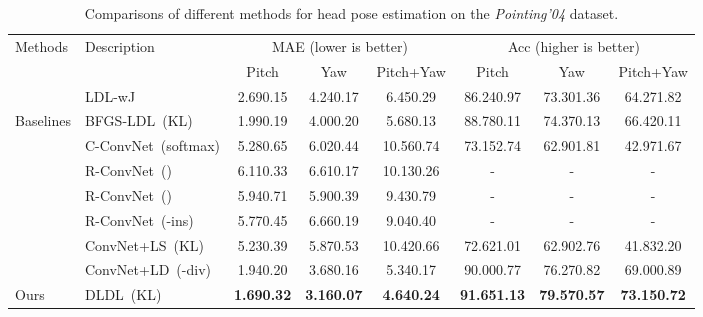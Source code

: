 \documentclass[journal]{IEEEtran}
\begin{document}
\begin{table*}[h]
	\centering
	\caption{Comparisons of different methods for head pose estimation on the \emph{Pointing'04} dataset. } \label{table:pose-po}
	\footnotesize
	\begin{tabular}{|l|l|ccc|ccc|}
		\hline
		\multirow{2}{*}{Methods} &\multirow{2}{*}{Description}  &\multicolumn{3}{c|}{MAE (lower is better)} &\multicolumn{3}{c|}{Acc (higher is better)}\\
		& & Pitch & Yaw & Pitch+Yaw  &Pitch & Yaw & Pitch+Yaw\\ \hline \hline
		\multirow{1}{*}{}
		&LDL-wJ~\cite{geng2014head} &2.690.15  &4.240.17 &6.450.29 &86.240.97  &73.301.36 &64.271.82  \\
		\hline \hline
		\multirow{7}{*}{Baselines}
		&BFGS-LDL~(KL)      &1.990.19   &4.000.20 	&5.680.13 	&88.780.11 &74.370.13 &66.420.11\\
		&C-ConvNet~(softmax)  &5.280.65 	&6.020.44 	&10.560.74 &73.152.74 &62.901.81 &42.971.67 \\
		&R-ConvNet~()  &6.110.33   &6.610.17  &10.130.26 &- &- &-  \\
		&R-ConvNet~()  &5.940.71   &5.900.39  &9.430.79  &- &- &-  \\
		&R-ConvNet~(-ins)  &5.770.45 &6.660.19 &9.040.40 &- &- &-  \\
        &ConvNet+LS~(KL)  &5.230.39 	&5.870.53 	&10.420.66 &72.621.01 &62.902.76 &41.832.20 \\
        &ConvNet+LD~(-div)
		&1.940.20 	&3.680.16  &5.340.17	&90.000.77 	&76.270.82	 &69.000.89 \\
		\hline \hline
		\multirow{1}{*}{Ours}
		&DLDL~(KL)
		&\textbf{1.690.32} 	&\textbf{3.160.07}  &\textbf{4.640.24} 	&\textbf{91.651.13} 	&\textbf{79.570.57}	 &\textbf{73.150.72} \\ \hline
	\end{tabular}
\end{table*}
\end{document}
